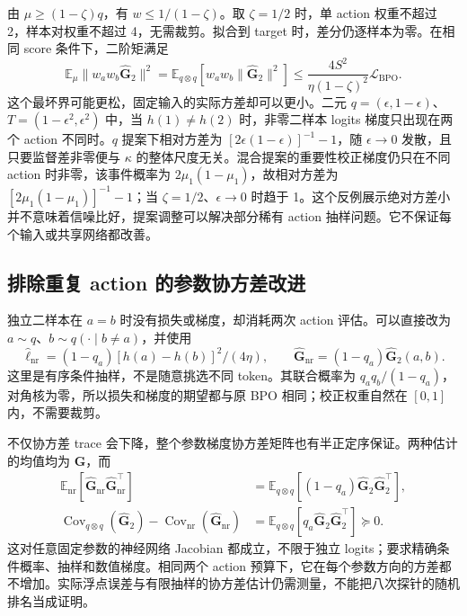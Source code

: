 \documentclass[lang=cn,scheme=chinese,openany]{../book/elegantbook}
\newcommand{\E}{\mathbb E}
\begin{document}
由 $\mu\ge(1-\zeta)q$，有 $w\le1/(1-\zeta)$。取 $\zeta=1/2$ 时，单 action 权重不超过 2，样本对权重不超过 4，无需裁剪。拟合到 target 时，差分仍逐样本为零。在相同 score 条件下，二阶矩满足
\begin{equation}
 \E_\mu\|w_aw_b\widehat{\bm G}_2\|^2
 =\E_{q\otimes q}[w_aw_b\|\widehat{\bm G}_2\|^2]
 \le\frac{4S^2}{\eta(1-\zeta)^2}\mathcal L_{\mathrm{BPO}}.
\end{equation}
这个最坏界可能更松，固定输入的实际方差却可以更小。二元 $q=(\epsilon,1-\epsilon)$、$T=(1-\epsilon^2,\epsilon^2)$ 中，当 $h(1)\ne h(2)$ 时，非零二样本 logits 梯度只出现在两个 action 不同时。$q$ 提案下相对方差为 $[2\epsilon(1-\epsilon)]^{-1}-1$，随 $\epsilon\to0$ 发散，且只要监督差非零便与 $\kappa$ 的整体尺度无关。混合提案的重要性校正梯度仍只在不同 action 时非零，该事件概率为 $2\mu_1(1-\mu_1)$，故相对方差为 $[2\mu_1(1-\mu_1)]^{-1}-1$；当 $\zeta=1/2$、$\epsilon\to0$ 时趋于 1。这个反例展示绝对方差小并不意味着信噪比好，提案调整可以解决部分稀有 action 抽样问题。它不保证每个输入或共享网络都改善。
\subsection{排除重复 action 的参数协方差改进}

独立二样本在 $a=b$ 时没有损失或梯度，却消耗两次 action 评估。可以直接改为 $a\sim q$、$b\sim q(\cdot\mid b\ne a)$，并使用
\begin{equation}
 \widehat\ell_{\mathrm{nr}}=(1-q_a)[h(a)-h(b)]^2/(4\eta),\qquad
 \widehat{\bm G}_{\mathrm{nr}}=(1-q_a)\widehat{\bm G}_2(a,b).
\end{equation}
这里是有序条件抽样，不是随意挑选不同 token。其联合概率为 $q_aq_b/(1-q_a)$，对角核为零，所以损失和梯度的期望都与原 BPO 相同；校正权重自然在 $[0,1]$ 内，不需要裁剪。

不仅协方差 trace 会下降，整个参数梯度协方差矩阵也有半正定序保证。两种估计的均值均为 $\bm G$，而
\begin{align}
 \E_{\mathrm{nr}}[\widehat{\bm G}_{\mathrm{nr}}\widehat{\bm G}_{\mathrm{nr}}^\top]
 &=\E_{q\otimes q}[(1-q_a)\widehat{\bm G}_2\widehat{\bm G}_2^\top],\\
 \operatorname{Cov}_{q\otimes q}(\widehat{\bm G}_2)
 -\operatorname{Cov}_{\mathrm{nr}}(\widehat{\bm G}_{\mathrm{nr}})
 &=\E_{q\otimes q}[q_a\widehat{\bm G}_2\widehat{\bm G}_2^\top]\succeq0.
\end{align}
这对任意固定参数的神经网络 Jacobian 都成立，不限于独立 logits；要求精确条件概率、抽样和数值梯度。相同两个 action 预算下，它在每个参数方向的方差都不增加。实际浮点误差与有限抽样的协方差估计仍需测量，不能把八次探针的随机排名当成证明。
\end{document}

